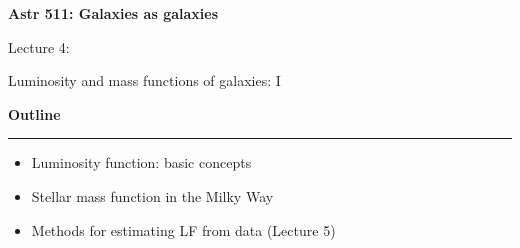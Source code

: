 \documentclass[letterpaper,landscape]{slides}
\begin{document}
\begin{slide}

\phantom{x}
\vskip -2in
\begin{center}
\bfseries
{\large {\color{blue} Astr 511: Galaxies as galaxies}}
\end{center}



\vskip 1.6in

{\centerline {\huge {\color{red}      Lecture 4:             }}}
\vskip 0.2in 
{\centerline {\Large {\color{blue}  Luminosity and mass functions of galaxies: I  }}}

\vfill
\end{slide}


\begin{slide}
\begin{center}
\bfseries
{\large {\color{red} Outline}}
\end{center}
\vskip 0.2in
\hrule

\begin{itemize}
\item Luminosity function: basic concepts
\item Stellar mass function in the Milky Way 
\item Methods for estimating LF from data (Lecture 5) 
\end{itemize}
%
%
\vfill
\end{slide}
 
\end{document}
